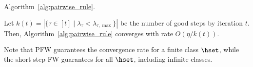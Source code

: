 Algorithm~\ref{alg:pairwise_rule}. 
\begin{cor.}
    Let 
    $
        k(t) = |\{
            \tau \in [t] \mid \lambda_{\tau} < \lambda_{\tau, \max}
        \}|
    $ be the number of good steps by iteration $t$. 
    Then, Algorithm~\ref{alg:pairwise_rule} converges with rate 
    $O(\eta / k(t))$. 
\end{cor.}
Note that PFW guarantees the convergence rate for a finite class $\hset$, 
while the short-step FW guarantees for all $\hset$, 
including infinite classes.

